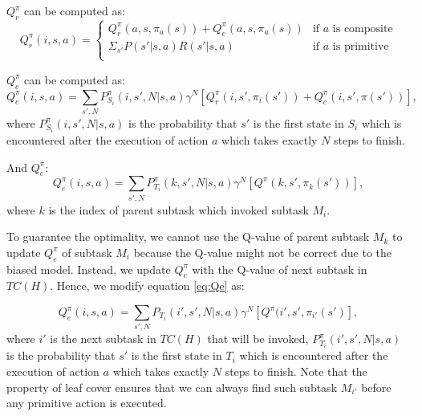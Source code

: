 

$Q_r^{\pi}$ can be computed as:
\begin{equation}
    Q_r^{\pi}(i, s, a) = 
    \left\{\begin{array}{ll}
        Q_r^{\pi}(a, s, \pi_a(s)) + Q_c^{\pi}(a, s, \pi_a(s))& \mbox{if $a$ is composite} \\
        \Sigma_{s'} P(s'|s, a)R(s'|s, a) & \mbox{if $a$ is primitive} \\  
    \end{array} \right.
    \label{eq:Qr}
\end{equation}

$Q_c^{\pi}$ can be computed as:
\begin{equation}
    Q_c^{\pi}(i, s, a) = \sum_{s', N} P_{S_i}^{\pi}(i, s', N|s, a)\gamma^N[Q_r^{\pi}(i, s', \pi_i(s')) + Q_c^{\pi}(i, s', \pi(s'))],
    \label{eq:Qc}
\end{equation}
where $P_{S_i}^{\pi}(i, s', N|s, a)$ is the probability that $s'$ is the first state in $S_i$ which
is encountered after the execution of action $a$ which takes exactly $N$ steps to finish. 

And $Q_e^{\pi}$:
\begin{equation}
    Q_e^{\pi}(i, s, a) = \sum_{s', N} P_{T_i}^{\pi}(k, s', N|s, a)\gamma^N[Q^{\pi}(k, s', \pi_k(s'))],
    \label{eq:Qe}
\end{equation}
where $k$ is the index of parent subtask which invoked subtask $M_i$.

To guarantee the optimality, we cannot use the Q-value of parent subtask $M_k$ to update $Q_e^{\pi}$ of subtask $M_i$ because the 
Q-value might not be correct due to the biased model.  Instead, 
we update $Q_e^{\pi}$ with the Q-value of next subtask in $TC(H)$.
Hence, we modify equation \ref{eq:Qe} as:

\begin{equation}
    Q_e^{\pi}(i, s, a) = \sum_{s', N} P_{T_i}(i', s', N|s, a)\gamma^N[Q^{\pi}(i', s', \pi_{i'}(s')],
    \label{eq:OptQe}
\end{equation}
where $i'$ is the next subtask in $TC(H)$ that will be invoked, $P_{T_i}^{\pi}(i', s', N|s, a)$ is the probability that $s'$ is the first state in $T_i$ which
is encountered after the execution of action $a$ which takes exactly $N$ steps to finish. 
Note that the property of leaf cover ensures that we can always find such subtask $M_{i'}$ before any primitive
action is executed. %


